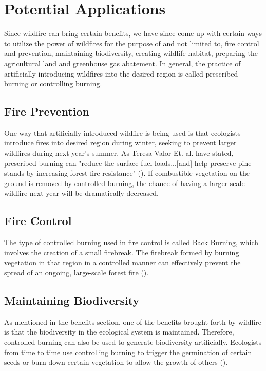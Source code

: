 \documentclass[man, 11pt]{apa6}
\begin{document}
  \section{Potential Applications}
  Since wildfire can bring certain benefits, we have since come up with certain ways to utilize the power 
  of wildfires for the purpose of and not limited to, fire control and prevention, maintaining biodiversity, 
  creating wildlife habitat, preparing the agricultural land and greenhouse gas abatement. In general, the practice
   of artificially introducing wildfires into the desired region is called prescribed burning or controlling burning.

   \subsection{Fire Prevention}
   One way that artificially introduced wildfire is being used is that ecologists introduce fires into desired 
   region during winter, seeking to prevent larger wildfires during next year's summer. As Teresa Valor Et. al. 
   have stated, prescribed burning can "reduce the surface fuel loads...[and] help preserve pine stands by 
   increasing forest fire-resistance" (\cite{fire_prevention}). If combustible vegetation on the ground is removed 
   by controlled burning, the chance of having a larger-scale wildfire next year will be dramatically decreased.

   \subsection{Fire Control}
   The type of controlled burning used in fire control is called Back Burning, which involves the creation 
   of a small firebreak. The firebreak formed by burning vegetation in that region in a controlled manner can 
   effectively prevent the spread of an ongoing, large-scale forest fire (\cite{backburning}).

   \subsection{Maintaining Biodiversity}
   As mentioned in the benefits section, one of the benefits brought forth by wildfire is that the biodiversity 
   in the ecological system is maintained. Therefore, controlled burning can also be used to generate 
   biodiversity artificially. Ecologists from time to time use controlling burning to trigger the germination 
   of certain seeds or burn down certain vegetation to allow the growth of others (\cite{biodiversity}).
\end{document}
